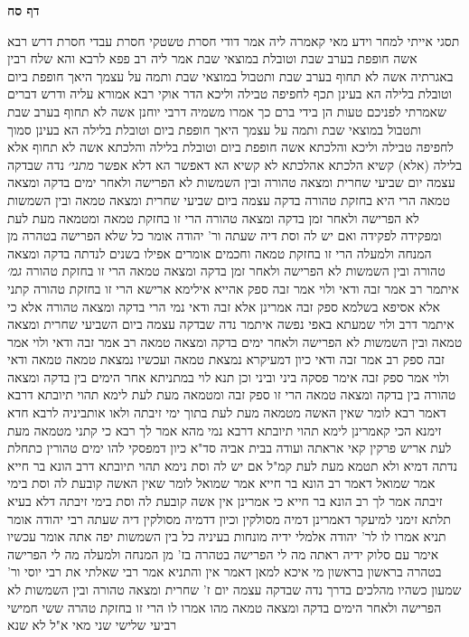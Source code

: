 \documentclass[12pt, openany]{book}
\newcommand{\sethebfont}{
\fontsize{10.5pt}{21.0pt} \selectfont
}
\newcommand{\twocol}[1]{
	{\sethebfont \begin{multicols}{2}
			#1
	\end{multicols}}	
}
\newcommand{\sectname}{}
\newcommand{\newsection}[1]{
	\addcontentsline{toc}{section}{#1}
	\renewcommand{\sectname}{#1}	
	\vspace{-\baselineskip}
	\begin{center}
		\textbf{%
\fontsize{16pt}{16pt}\selectfont
			#1}
	\end{center}
	\vspace{-\baselineskip}
	\nopagebreak
}
\begin{document}
\newsection{דף סח}
\twocol{תסגי אייתי למחר וידע מאי קאמרה ליה אמר דודי חסרת טשטקי חסרת עבדי חסרת 
דרש רבא אשה חופפת בערב שבת וטובלת במוצאי שבת אמר ליה רב פפא לרבא והא שלח רבין באגרתיה אשה לא תחוף בערב שבת ותטבול במוצאי שבת 
ותמה על עצמך היאך חופפת ביום וטובלת בלילה הא בעינן תכף לחפיפה טבילה וליכא 
הדר אוקי רבא אמורא עליה ודרש דברים שאמרתי לפניכם טעות הן בידי ברם כך אמרו משמיה דרבי יוחנן אשה לא תחוף בערב שבת ותטבול במוצאי שבת ותמה על עצמך היאך חופפת ביום וטובלת בלילה הא בעינן סמוך לחפיפה טבילה וליכא 
והלכתא אשה חופפת ביום וטובלת בלילה והלכתא אשה לא תחוף אלא בלילה (אלא) קשיא הלכתא אהלכתא 
לא קשיא הא דאפשר הא דלא אפשר
{\large\emph{מתני׳}} נדה שבדקה עצמה יום שביעי שחרית ומצאה טהורה ובין השמשות לא הפרישה ולאחר ימים בדקה ומצאה טמאה הרי היא בחזקת טהורה
בדקה עצמה ביום שביעי שחרית ומצאה טמאה ובין השמשות לא הפרישה ולאחר זמן בדקה ומצאה טהורה הרי זו בחזקת טמאה
ומטמאה מעת לעת ומפקידה לפקידה ואם יש לה וסת דיה שעתה 
ור' יהודה אומר כל שלא הפרישה בטהרה מן המנחה ולמעלה הרי זו בחזקת טמאה וחכמים אומרים אפילו בשנים לנדתה בדקה ומצאה טהורה ובין השמשות לא הפרישה ולאחר זמן בדקה ומצאה טמאה הרי זו בחזקת טהורה
{\large\emph{גמ׳}} איתמר רב אמר זבה ודאי ולוי אמר זבה ספק 
אהייא אילימא ארישא הרי זו בחזקת טהורה קתני 
אלא אסיפא בשלמא ספק זבה אמרינן אלא זבה ודאי נמי הרי בדקה ומצאה טהורה 
אלא כי איתמר דרב ולוי שמעתא באפי נפשה איתמר נדה שבדקה עצמה ביום השביעי שחרית ומצאה טמאה ובין השמשות לא הפרישה ולאחר ימים בדקה ומצאה טמאה רב אמר זבה ודאי ולוי אמר זבה ספק 
רב אמר זבה ודאי כיון דמעיקרא נמצאת טמאה ועכשיו נמצאת טמאה טמאה ודאי ולוי אמר ספק זבה אימר פסקה ביני וביני
וכן תנא לוי במתניתא אחר הימים בין בדקה ומצאה טהורה בין בדקה ומצאה טמאה הרי זו ספק זבה
ומטמאה מעת לעת לימא תהוי תיובתא דרבא דאמר רבא לומר שאין האשה מטמאה מעת לעת בתוך ימי זיבתה 
ולאו אותביניה לרבא חדא זימנא הכי קאמרינן לימא תהוי תיובתא דרבא נמי מהא 
אמר לך רבא כי קתני מטמאה מעת לעת אריש פרקין קאי אראתה ועודה בבית אביה 
סד"א כיון דמפסקי להו ימים טהורין כתחלת נדתה דמיא ולא תטמא מעת לעת קמ"ל
אם יש לה וסת נימא תהוי תיובתא דרב הונא בר חייא אמר שמואל דאמר רב הונא בר חייא אמר שמואל לומר שאין האשה קובעת לה וסת בימי זיבתה 
אמר לך רב הונא בר חייא כי אמרינן אין אשה קובעת לה וסת בימי זיבתה דלא בעיא תלתא זימני למיעקר דאמרינן דמיה מסולקין וכיון דדמיה מסולקין דיה שעתה
רבי יהודה אומר תניא אמרו לו לר' יהודה אלמלי ידיה מונחות בעיניה כל בין השמשות יפה אתה אומר
עכשיו אימר עם סלוק ידיה ראתה מה לי הפרישה בטהרה בז' מן המנחה ולמעלה מה לי הפרישה בטהרה בראשון 
בראשון מי איכא למאן דאמר 
אין והתניא אמר רבי שאלתי את רבי יוסי ור' שמעון כשהיו מהלכים בדרך נדה שבדקה עצמה יום ז' שחרית ומצאה טהורה ובין השמשות לא הפרישה ולאחר הימים בדקה ומצאה טמאה מהו 
אמרו לו הרי זו בחזקת טהרה ששי חמישי רביעי שלישי שני מאי א"ל לא שנא 
}
\end{document}
